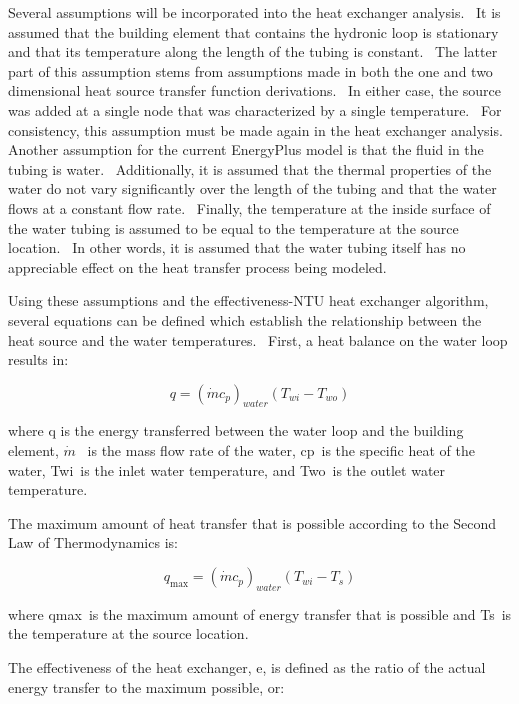 Several assumptions will be incorporated into the heat exchanger analysis.~ It is assumed that the building element that contains the hydronic loop is stationary and that its temperature along the length of the tubing is constant.~ The latter part of this assumption stems from assumptions made in both the one and two dimensional heat source transfer function derivations.~ In either case, the source was added at a single node that was characterized by a single temperature.~ For consistency, this assumption must be made again in the heat exchanger analysis.~ Another assumption for the current EnergyPlus model is that the fluid in the tubing is water.~ Additionally, it is assumed that the thermal properties of the water do not vary significantly over the length of the tubing and that the water flows at a constant flow rate.~ Finally, the temperature at the inside surface of the water tubing is assumed to be equal to the temperature at the source location.~ In other words, it is assumed that the water tubing itself has no appreciable effect on the heat transfer process being modeled.

Using these assumptions and the effectiveness-NTU heat exchanger algorithm, several equations can be defined which establish the relationship between the heat source and the water temperatures.~ First, a heat balance on the water loop results in:

\begin{equation}
q = {\left( {\dot m{c_p}} \right)_{water}}\left( {{T_{wi}} - {T_{wo}}} \right)
\end{equation}

where q is the energy transferred between the water loop and the building element, \(\dot m\) ~is the mass flow rate of the water, cp~is the specific heat of the water, Twi~is the inlet water temperature, and Two~is the outlet water temperature.

The maximum amount of heat transfer that is possible according to the Second Law of Thermodynamics is:

\begin{equation}
{q_{\max }} = {\left( {\dot m{c_p}} \right)_{water}}\left( {{T_{wi}} - {T_s}} \right)
\end{equation}

where qmax~is the maximum amount of energy transfer that is possible and Ts~is the temperature at the source location.

The effectiveness of the heat exchanger, e, is defined as the ratio of the actual energy transfer to the maximum possible, or:

